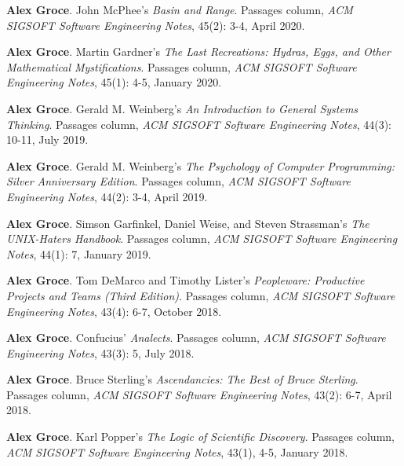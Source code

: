\documentclass[ComputerScience]{vita}
\begin{document}
\begin{vita}
\begin{Columns, Book Reviews, and Magazine Articles}
\item {\bf Alex Groce}. 
\newblock John McPhee's \emph{Basin and Range}. 
\newblock Passages column, \emph{ACM SIGSOFT Software Engineering 
  Notes}, 45(2): 3-4, April 2020.
  
\item {\bf Alex Groce}. 
\newblock Martin Gardner's \emph{The Last Recreations: Hydras, Eggs, and Other Mathematical Mystifications}. 
\newblock Passages column, \emph{ACM SIGSOFT Software Engineering 
  Notes}, 45(1): 4-5, January 2020.
  
\item {\bf Alex Groce}. 
\newblock Gerald M. Weinberg's \emph{An Introduction to General
  Systems Thinking}.
\newblock Passages column, \emph{ACM SIGSOFT Software Engineering
  Notes}, 44(3): 10-11, July 2019.
  
\item {\bf Alex Groce}. 
\newblock Gerald M. Weinberg's \emph{The Psychology of Computer
  Programming: Silver Anniversary Edition}.
\newblock Passages column, \emph{ACM SIGSOFT Software Engineering
  Notes}, 44(2): 3-4, April 2019.
  
\item {\bf Alex Groce}.
\newblock Simson Garfinkel, Daniel Weise, and Steven Strassman's \emph{The UNIX-Haters Handbook}. 
\newblock Passages column, \emph{ACM SIGSOFT Software Engineering 
  Notes}, 44(1): 7, January 2019.

\item {\bf Alex Groce}. 
\newblock Tom DeMarco and Timothy Lister's \emph{Peopleware: Productive Projects and Teams (Third Edition)}. 
\newblock Passages column, \emph{ACM SIGSOFT Software Engineering 
  Notes}, 43(4): 6-7, October 2018.

\item {\bf Alex Groce}. 
\newblock Confucius' \emph{Analects}. 
\newblock Passages column, \emph{ACM SIGSOFT Software Engineering 
  Notes}, 43(3): 5, July 2018.

\item {\bf Alex Groce}. 
\newblock Bruce Sterling's \emph{Ascendancies: The Best of Bruce Sterling}. 
\newblock Passages column, \emph{ACM SIGSOFT Software Engineering Notes}, 43(2): 6-7, April 2018.

\item {\bf Alex Groce}.
\newblock Karl Popper's \emph{The Logic of Scientific Discovery}.
\newblock Passages column, \emph{ACM SIGSOFT Software Engineering Notes}, 43(1), 4-5, January 2018.


\end{Columns, Book Reviews, and Magazine Articles}
\end{vita}
\end{document}
